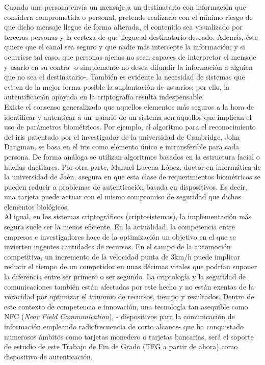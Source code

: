 \documentclass[../PFC.tex]{subfiles}
\begin{document}
Cuando una persona envía un mensaje a un destinatario con información que considera comprometida o personal, pretende realizarlo con el mínimo riesgo de que dicho mensaje llegue de forma alterada, el contenido sea visualizado por terceras personas y la certeza de que llegue al destinatario deseado. Además, éste quiere que el canal sea seguro y que nadie más intercepte la información; y si ocurriese tal caso, que personas ajenas no sean capaces de interpretar el mensaje y usarlo en su contra -o simplemente no desea difundir la información a alguien que no sea el destinatario-. También es evidente la necesidad de sistemas que eviten de la mejor forma posible la suplantación de usuarios; por ello, la autentificación apoyada en la criptografía resulta indespensable.
\*
\vspace{0.5515cm}
\\
Existe el consenso generalizado que aquellos elementos más seguros a la hora de identificar y autenticar a un usuario de un sistema son aquellos que implican el uso de parámetros biométricos. Por ejemplo, el algoritmo para el reconocimiento del iris patentado por el investigador de la universidad de Cambridge, John Daugman, se basa en el iris como elemento único e intransferible para cada persona\cite{ramli2008iris}. De forma análoga se utilizan algoritmos basados en la estructura facial o huellas dactilares. Por otra parte, Manuel Lucena López, doctor en informática de la universidad de Jaén, asegura en \cite{lucena} que esta clase de requerimientos biométricos se pueden reducir a problemas de autenticación basada en dispositivos. Es decir, una tarjeta puede actuar con el mismo compromiso de seguridad que dichos elementos biológicos.
\*
\vspace{0.5515cm}
\\
Al igual, en los sistemas criptográficos (criptosistemas), la implementación más segura suele ser la menos eficiente. En la actualidad, la competencia entre empresas e investigadores hace de la optimización un objetivo en el que se invierten ingentes cantidades de recursos. En el campo de la automoción competitiva, un incremento de la velocidad punta de 3km/h puede implicar reducir el tiempo de un competidor en unas décimas vitales que podrían suponer la diferencia entre ser primero o ser segundo. La criptología y la seguridad de comunicaciones también están afectadas por este hecho y no están exentas de la voracidad por optimizar el trinomio de recursos, tiempo y resultados. Dentro de este contexto de competencia e innovación, una tecnología tan asequible como NFC (\textit{Near Field Communication}), - dispositivos para la comunicación de información empleando radiofrecuencia de corto alcance- que ha conquistado numerosos ámbitos como tarjetas monedero o tarjetas bancarias, será el soporte de estudio de este Trabajo de Fin de Grado (TFG a partir de ahora) como dispositivo de autenticación.
\end{document}
